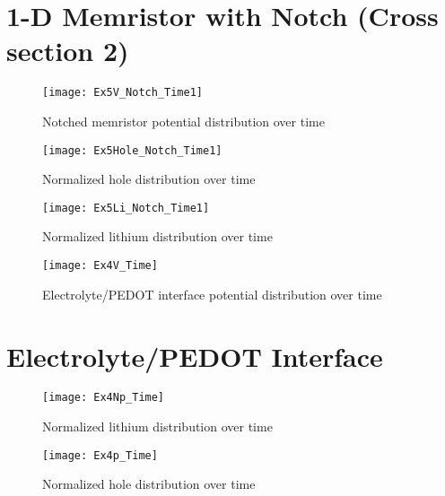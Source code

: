 \section{1-D Memristor with Notch (Cross section 2)}
\begin{landscape}
\begin{figure}[!htp]
\centering
\texttt{[image: Ex5V\_Notch\_Time1]}
\caption{Notched memristor potential distribution over time} 
\label{}
\end{figure}
\end{landscape}

\begin{landscape}
\begin{figure}[!htp]
\centering
\texttt{[image: Ex5Hole\_Notch\_Time1]}
\caption{Normalized hole distribution over time} 
\label{}
\end{figure}
\end{landscape}


\begin{landscape}
\begin{figure}[!htp]
\centering
\texttt{[image: Ex5Li\_Notch\_Time1]}
\caption{Normalized lithium distribution over time} 
\label{}
\end{figure}
\end{landscape}


\begin{landscape}
\begin{figure}[!htp]
\centering
\texttt{[image: Ex4V\_Time]}
\caption{Electrolyte/PEDOT interface potential distribution over time} 
\label{}
\end{figure}
\end{landscape}



\section{Electrolyte/PEDOT Interface}
\begin{landscape}
\begin{figure}[!htp]
\centering
\texttt{[image: Ex4Np\_Time]}
\caption{Normalized lithium distribution over time} 
\label{}
\end{figure}
\end{landscape}

\begin{landscape}
\begin{figure}[!htp]
\centering
\texttt{[image: Ex4p\_Time]}
\caption{Normalized hole distribution over time} 
\label{}
\end{figure}
\end{landscape}
